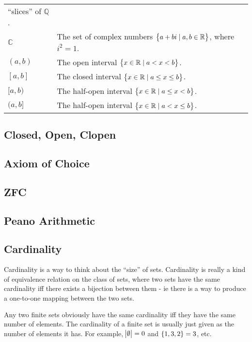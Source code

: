 \documentclass[a4paper,11pt]{article}
\begin{document}
\begin{center}
\begin{longtable}{ll}
                   ``slices'' of $\mathbb{Q}$. \\
    $\mathbb{C}$ & The set of complex numbers
                   $\set{a + bi \mid a, b \in \mathbb{R}}$, where $i^2 = 1$.\\
    $(a, b)$ & The open interval $\set{x \in \mathbb{R} \mid a < x < b}$.\\
    $[a, b]$ & The closed interval
               $\set{x \in \mathbb{R} \mid a \le x \le b}$.\\
    $[a, b)$ & The half-open interval
               $\set{x \in \mathbb{R} \mid a \le x < b}$.\\
    $(a, b]$ & The half-open interval
               $\set{x \in \mathbb{R} \mid a < x \le b}$.\\
    \bottomrule
    \end{longtable}
    \end{center}

    \subsection{Closed, Open, Clopen}

    \subsection{Axiom of Choice}

    \subsection{ZFC}

    \subsection{Peano Arithmetic}

    \subsection{Cardinality}

    Cardinality is a way to think about the ``size'' of sets. Cardinality is
    really a kind of equivalence relation on the class of sets, where two sets
    have the same cardinality iff there exists a bijection between them - ie
    there is a way to produce a one-to-one mapping between the two sets.

    Any two finite sets obviously have the same cardinality iff they have the
    same number of elements. The cardinality of a finite set is usually just
    given as the number of elements it has. For example, $\abs \emptyset = 0$
    and $\set{1, 3, 2} = 3$, etc.
\end{document}
